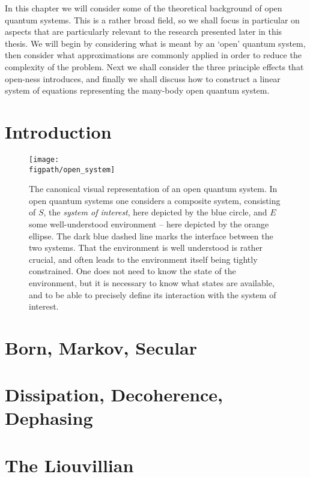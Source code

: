 In this chapter we will consider some of the theoretical background of open quantum systems. This is a rather broad field, so we shall focus in particular on aspects that are particularly relevant to the research presented later in this thesis. We will begin by considering what is meant by an `open' quantum system, then consider what approximations are commonly applied in order to reduce the complexity of the problem. Next we shall consider the three principle effects that open-ness introduces, and finally we shall discuss how to construct a linear system of equations representing the many-body open quantum system.  

\section{Introduction}
\begin{figure}[ht!]
\centering
\texttt{[image: \\figpath/open\_system]}
\caption{The canonical visual representation of an open quantum system. In open quantum systems one considers a composite system, consisting of \(S\), the \emph{system of interest}, here depicted by the blue circle, and \(E\) some well-understood environment -- here depicted by the orange ellipse. The dark blue dashed line marks the interface between the two systems. That the environment is well understood is rather crucial, and often leads to the environment itself being tightly constrained. One does not need to know the state of the environment, but it is necessary to know what states are available, and to be able to precisely define its interaction with the system of interest.}
\label{fig:oqs1-1}
\end{figure}


\section{Born, Markov, Secular}

\section{Dissipation, Decoherence, Dephasing}

\section{The Liouvillian}
